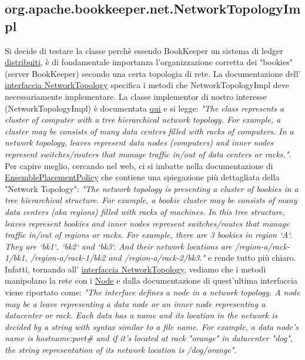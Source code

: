 \documentclass[10pt, a4paper]{article}
\begin{document}
	\subsection{org.apache.bookkeeper.net.NetworkTopologyImpl}
	Si decide di testare la classe perchè essendo BookKeeper un sistema di ledger \underline{distribuiti}, è di fondamentale importanza l'organizzazione
	corretta dei "bookies" (server BookKeeper) secondo una certa topologia di rete. La documentazione dell'
	\href{https://bookkeeper.apache.org/docs/latest/api/javadoc/org/apache/bookkeeper/net/NetworkTopology.html}{interfaccia NetworkTopology} specifica i
	metodi che NetworkTopologyImpl deve necessariamente implementare. La classe implementor di nostro interesse (NetworkTopologyImpl) è documentata 
	\href{https://bookkeeper.apache.org/docs/latest/api/javadoc/org/apache/bookkeeper/net/NetworkTopologyImpl.html}{qui} e si legge:
	\textit{"The class represents a cluster of computer with a tree hierarchical network topology. 
	For example, a cluster may be consists of many data centers filled with racks of computers. In a network topology, 
	leaves represent data nodes (computers) and inner nodes represent switches/routers that manage traffic in/out of data centers or racks."}.
	Per capire meglio, cercando nel web, ci si imbatte nella documentazione di 
	\href{https://bookkeeper.apache.org/docs/latest/api/javadoc/org/apache/bookkeeper/client/EnsemblePlacementPolicy.html}{EnsemblePlacementPolicy} 
	che contiene una spiegazione più dettagliata della "Network Topology": 
	\textit{"The network topology is presenting a cluster of bookies in a tree hierarchical structure. 
	For example, a bookie cluster may be consists of many data centers (aka regions) filled with racks of machines. 
	In this tree structure, leaves represent bookies and inner nodes represent switches/routes that manage traffic in/out of regions or racks.
	For example, there are 3 bookies in region `A`. They are `bk1`, `bk2` and `bk3`. And their network locations are /region-a/rack-1/bk1, 
	/region-a/rack-1/bk2 and /region-a/rack-2/bk3."} e rende tutto più chiaro. Infatti, tornando all'
	\href{https://bookkeeper.apache.org/docs/latest/api/javadoc/org/apache/bookkeeper/net/NetworkTopology.html}{interfaccia NetworkTopology}, vediamo che i metodi
	manipolano la rete con i \href{https://bookkeeper.apache.org/docs/latest/api/javadoc/org/apache/bookkeeper/net/Node.html}{Node} e dalla documentazione di
	quest'ultima interfaccia viene riportato come: \textit{"The interface defines a node in a network topology. A node may be a leave representing a data node 
	or an inner node representing a datacenter or rack. Each data has a name and its location in the network is decided by a string with syntax similar to a file name. 
	For example, a data node's name is hostname:port\# and if it's located at rack "orange" in datacenter "dog", the string representation of its network location is /dog/orange"}.
\end{document}
